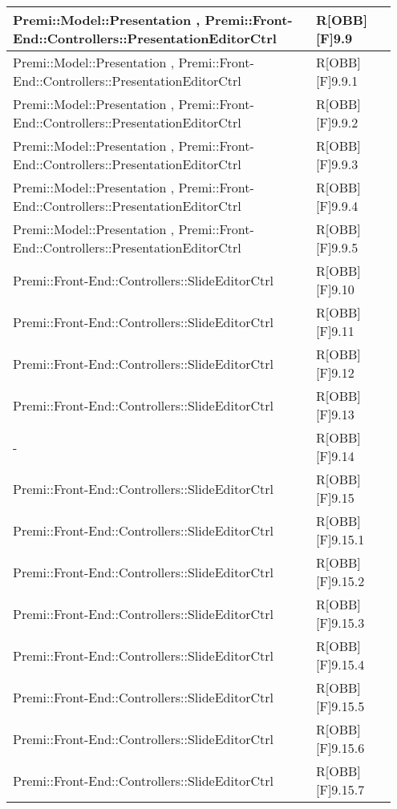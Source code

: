\begin{table}[h]
	\begin{center}
		\begin{tabular}{|p{0.75\linewidth}|p{0.2\linewidth}|}
			\toprule
			Premi::Model::Presentation , Premi::Front-End::Controllers::PresentationEditorCtrl & R[OBB][F]9.9 \\
		\midrule
			Premi::Model::Presentation , Premi::Front-End::Controllers::PresentationEditorCtrl & R[OBB][F]9.9.1 \\
		\midrule
			Premi::Model::Presentation , Premi::Front-End::Controllers::PresentationEditorCtrl & R[OBB][F]9.9.2 \\
		\midrule
			Premi::Model::Presentation , Premi::Front-End::Controllers::PresentationEditorCtrl & R[OBB][F]9.9.3 \\
		\midrule
			Premi::Model::Presentation , Premi::Front-End::Controllers::PresentationEditorCtrl & R[OBB][F]9.9.4 \\
		\midrule
			Premi::Model::Presentation , Premi::Front-End::Controllers::PresentationEditorCtrl & R[OBB][F]9.9.5 \\
		\midrule
			Premi::Front-End::Controllers::SlideEditorCtrl & R[OBB][F]9.10 \\
		\midrule
			Premi::Front-End::Controllers::SlideEditorCtrl & R[OBB][F]9.11 \\
		\midrule
			Premi::Front-End::Controllers::SlideEditorCtrl & R[OBB][F]9.12 \\
		\midrule
			Premi::Front-End::Controllers::SlideEditorCtrl & R[OBB][F]9.13 \\
		\midrule
			- & R[OBB][F]9.14 \\
		\midrule
			Premi::Front-End::Controllers::SlideEditorCtrl & R[OBB][F]9.15 \\
		\midrule
			Premi::Front-End::Controllers::SlideEditorCtrl & R[OBB][F]9.15.1 \\
		\midrule
			Premi::Front-End::Controllers::SlideEditorCtrl & R[OBB][F]9.15.2 \\
		\midrule
			Premi::Front-End::Controllers::SlideEditorCtrl & R[OBB][F]9.15.3 \\
		\midrule
			Premi::Front-End::Controllers::SlideEditorCtrl & R[OBB][F]9.15.4 \\
		\midrule
			Premi::Front-End::Controllers::SlideEditorCtrl & R[OBB][F]9.15.5 \\
		\midrule
			Premi::Front-End::Controllers::SlideEditorCtrl & R[OBB][F]9.15.6 \\
		\midrule
			Premi::Front-End::Controllers::SlideEditorCtrl & R[OBB][F]9.15.7 \\

\end{tabular}
\end{center}
\end{table}
